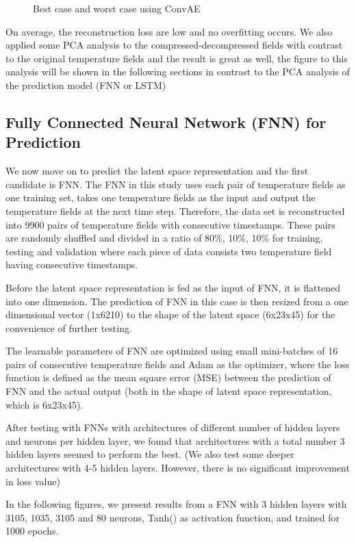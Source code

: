 \begin{figure}[H]
\caption{Best case and worst case using ConvAE}
\label{fig:figures}
\end{figure}


On average, the reconstruction loss are low and no overfitting occurs. We also applied some PCA analysis to the compressed-decompressed fields with contrast to the original temperature fields and the result is great as well, the figure to this analysis will be shown in the following sections in contrast to the PCA analysis of the prediction model (FNN or LSTM) 


\subsection{Fully Connected Neural Network (FNN) for Prediction}

We now move on to predict the latent space representation and the first candidate is FNN. The FNN in this study uses each pair of temperature fields as one training set, takes one temperature fields as the input and output the temperature fields at the next time step. Therefore, the data set is reconstructed into 9900 pairs of temperature fields with consecutive timestamps. These pairs are randomly shuffled and divided in a ratio of 80\%, 10\%, 10\% for training, testing and validation where each piece of data consists two temperature field having consecutive timestamps.

Before the latent space representation is fed as the input of FNN, it is flattened into one dimension. The prediction of FNN in this case is then resized from a one dimensional vector (1x6210) to the shape of the latent space (6x23x45) for the convenience of further testing.

The learnable parameters of FNN are optimized using small mini-batches of 16 pairs of consecutive temperature fields and Adam as the optimizer, where the loss function is defined as the mean square error (MSE) between the prediction of FNN and the actual output (both in the shape of latent space representation, which is 6x23x45).

After testing with FNNs with architectures of different number of hidden layers and neurons per hidden layer, we found that architectures with a total number 3 hidden layers seemed to perform the best. (We also test some deeper architectures with 4-5 hidden layers. However, there is no significant improvement in loss value)

In the following figures, we present results from a FNN with 3 hidden layers with 3105, 1035, 3105 and 80 neurons, Tanh() as activation function, and trained for 1000 epochs.

